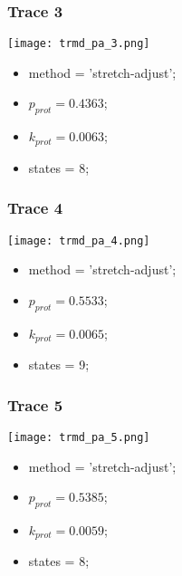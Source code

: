 \subsubsection{Trace 3}
\begin{minipage}[c]{0.7\textwidth}
    \texttt{[image: trmd\_pa\_3.png]}
\end{minipage}
\hfill
\begin{minipage}[c]{0.45\textwidth}
    \begin{itemize}
        \item method = 'stretch-adjust';
        \item $p_{prot}=0.4363$;
        \item $k_{prot}=0.0063$;
        \item states = 8;
    \end{itemize}
\end{minipage}

\subsubsection{Trace 4}
\begin{minipage}[c]{0.7\textwidth}
    \texttt{[image: trmd\_pa\_4.png]}
\end{minipage}
\hfill
\begin{minipage}[c]{0.45\textwidth}
    \begin{itemize}
        \item method = 'stretch-adjust';
        \item $p_{prot}=0.5533$;
        \item $k_{prot}=0.0065$;
        \item states = 9;
    \end{itemize}
\end{minipage}

\subsubsection{Trace 5}
\begin{minipage}[c]{0.7\textwidth}
    \texttt{[image: trmd\_pa\_5.png]}
\end{minipage}
\hfill
\begin{minipage}[c]{0.45\textwidth}
    \begin{itemize}
        \item method = 'stretch-adjust';
        \item $p_{prot}=0.5385$;
        \item $k_{prot}=0.0059$;
        \item states = 8;
    \end{itemize}
\end{minipage}

